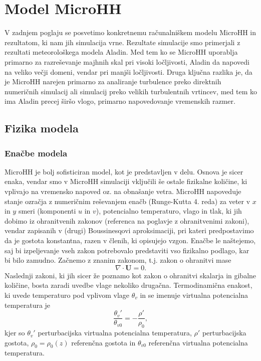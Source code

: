 \documentclass[mat2, tisk]{fmfdelo}
\begin{document}
\section{Model MicroHH}

V zadnjem poglaju se posvetimo konkretnemu računalniškem modelu 
MicroHH in rezultatom, ki nam jih simulacija vrne. Rezultate 
simulacije smo primerjali z rezultati 
meteorološkega modela Aladin. Med tem ko se MicroHH uporablja 
primarno za razreševanje majhnih skal pri visoki ločljivosti, 
Aladin da napovedi na veliko večji domeni, vendar pri manjši 
ločljivosti. Druga ključna razlika je, da je MicroHH narejen 
primarno za analiranje turbulence preko direktnih numeričnih 
simulacij ali simulacij preko velikih turbulentnih vrtincev, med tem 
ko ima Aladin precej širšo vlogo, primarno napovedovanje vremenskih 
razmer.

\subsection{Fizika modela}
\subsubsection{Enačbe modela}
MicroHH je bolj sofisticiran model, kot je predstavljen v delu. Osnova
je sicer enaka, vendar smo v MicroHH simulaciji vključili še ostale 
fizikalne količine, ki vplivajo na vremensko napoved oz. na obnašanje 
vetra. 
MicroHH napoveduje stanje ozračja z numeričnim reševanjem enačb 
(Runge-Kutta 4. reda) za veter v $x$ in $y$ smeri (komponenti $u$ in $v$), potencialno temperaturo, 
vlago in tlak, ki jih dobimo iz ohranitvenih zakonov (referenca na 
poglavje z ohranitvenimi zakoni), vendar zapisanih v (drugi) 
Boussinesqovi aproksimaciji, pri kateri predpostavimo da je gostota 
konstantna, razen v členih, ki opisujejo vzgon. Enačbe le naštejemo, 
saj bi izpeljevanje vseh zakon potrebovalo predstaviti vso fizikalno 
podlago, kar bi bilo zamudno. Začnemo z znanim zakonom, t.j. zakon o 
ohranitvi mase 
$$
\nabla \cdot \textbf{U} = 0.
$$
Naslednji zakoni, ki jih sicer že poznamo kot zakon o ohranitvi skalarja in gibalne količine, bosta zaradi uvedbe vlage nekoliko drugačna. 
Termodinamična enakost, ki uvede temperaturo pod vplivom vlage 
$\theta_v$ in se imenuje virtualna potencialna temperatura je 
\begin{equation}
\frac{\theta_v'}{\theta_{v0}} = - \frac{\rho'}{\rho_0},
\end{equation}
kjer so $\theta_v'$ perturbacijska virtualna potencialna temperatura, $\rho'$ perturbacijska gostota, $\rho_0 = \rho_0(z)$ referenčna gostota in $\theta_{v0}$ referenčna virtualna potencialna temperatura.
\end{document}
